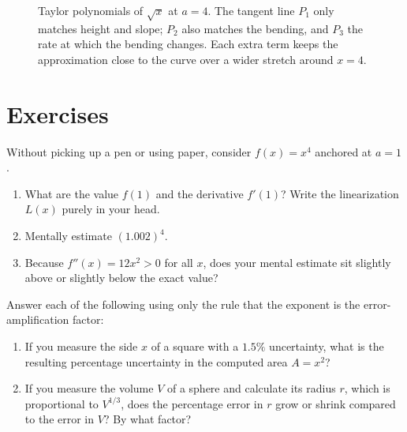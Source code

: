 \begin{figure}[htbp]
\centering
{}
\caption{Taylor polynomials of $\sqrt{x}$ at $a=4$. The tangent line $P_1$ only
matches height and slope; $P_2$ also matches the bending, and $P_3$ the rate at
which the bending changes. Each extra term keeps the approximation close to the
curve over a wider stretch around $x=4$.}
\label{ch14:fig-taylor}
\end{figure}

\section{Exercises}
\label{ch14:exercises}

\begin{exercise}
Without picking up a pen or using paper, consider $f(x) = x^4$ anchored at $a = 1$.
\begin{enumerate}
\item What are the value $f(1)$ and the derivative $f'(1)$? Write the linearization $L(x)$ purely in your head.
\item Mentally estimate $(1.002)^4$.
\item Because $f''(x) = 12x^2 > 0$ for all $x$, does your mental estimate sit slightly above or slightly below the exact value?
\end{enumerate}
\end{exercise}

\begin{exercise}
Answer each of the following using only the rule that the exponent is the error-amplification factor:
\begin{enumerate}
\item If you measure the side $x$ of a square with a $1.5\%$ uncertainty, what is the resulting percentage uncertainty in the computed area $A = x^2$?
\item If you measure the volume $V$ of a sphere and calculate its radius $r$, which is proportional to $V^{1/3}$, does the percentage error in $r$ grow or shrink compared to the error in $V$? By what factor?
\end{enumerate}
\end{exercise}

